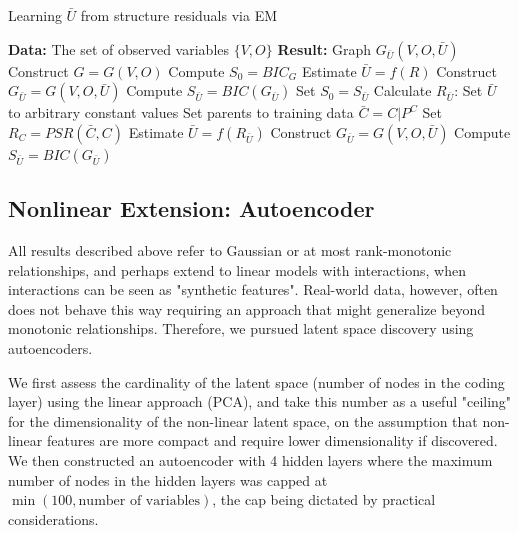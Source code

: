 \documentclass{article}
\begin{document}
\begin{algorithm}%
 \caption{Learning $\bar{U}$ from structure residuals via EM}
 \label{alg:latentEM}
\begin{algorithmic}
 \STATE \textbf{Data:} The set of observed variables $\{V, O\}$
 \STATE \textbf{Result:} Graph $G_{\bar{U}}(V, O, \bar{U})$
 \STATE Construct $G = G(V, O)$\;
 \STATE Compute $S_0 = BIC_{G}$\;
 \STATE Estimate $\bar{U} = f(R)$\;
 \STATE Construct $G_{\bar{U}} = G(V, O, \bar{U})$\;
 \STATE Compute $S_{\bar{U}} = BIC(G_{\bar{U}})$\;
  \STATE Set $S_0 = S_{\bar{U}}$\;
  \STATE Calculate $R_{\bar{U}}$:\;
  \STATE Set $\bar{U}$ to arbitrary constant values\;
  	\STATE Set parents to training data\;
  	\STATE $\bar{C} = C|P^C$\;
  	\STATE Set $R_C = PSR(\bar{C}, C)$\;
  \ENDFOR
  \STATE Estimate $\bar{U} = f(R_{\bar{U}})$\;
  \STATE Construct $G_{\bar{U}} = G(V, O, \bar{U})$\;
  \STATE Compute $S_{\bar{U}} = BIC(G_{\bar{U}})$\;
 \ENDWHILE
\end{algorithmic}
\end{algorithm}



\subsection{Nonlinear Extension: Autoencoder}

All results described above refer to Gaussian or at most rank-monotonic relationships, and perhaps extend to linear models with interactions, when interactions can be seen as "synthetic features". Real-world data, however, often does not behave this way requiring an approach that might generalize beyond monotonic relationships.  Therefore, we pursued latent space discovery using autoencoders.

We first assess the cardinality of the latent space (number of nodes in the coding layer) using the linear approach (PCA), and take this number as a useful "ceiling" for the dimensionality of the non-linear latent space, on the assumption that non-linear features are more compact and require lower dimensionality if discovered.  We then constructed an autoencoder with 4 hidden layers where the maximum number of nodes in the hidden layers was capped at $\min (100, \textrm{number of variables})$, the cap being dictated by practical considerations.
\end{document}
